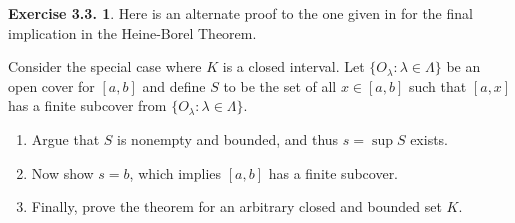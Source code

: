 \documentclass[12pt]{article}
\theoremstyle{definition}
\theoremstyle{exercise}
\newtheorem{exercise}{Exercise 3.3.}
\theoremstyle{solution}
\begin{document}
\begin{exercise}
\label{ex:10}
    Here is an alternate proof to the one given in  for the final implication in the Heine-Borel Theorem.

    Consider the special case where \( K \) is a closed interval. Let \( \{ O_{\lambda} : \lambda \in \Lambda \} \) be an open cover for \( [a, b] \) and define \( S \) to be the set of all \( x \in [a, b] \) such that \( [a, x] \) has a finite subcover from \( \{ O_{\lambda} : \lambda \in \Lambda \} \).
    \begin{enumerate}
        \item Argue that \( S \) is nonempty and bounded, and thus \( s = \sup S \) exists.

        \item Now show \( s = b \), which implies \( [a, b] \) has a finite subcover.

        \item Finally, prove the theorem for an arbitrary closed and bounded set \( K \).
    \end{enumerate}
\end{exercise}
\end{document}
